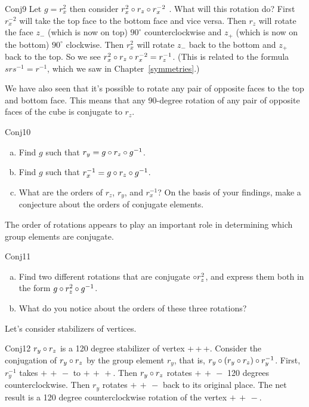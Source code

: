 \begin{example}{Conj9} 
Let  $g=r_x^2$ then consider $r_x^2\circ r_z\circ r_x^{-2}$ .   What will this rotation do? First $r_x^{-2}$ will take the top face to the bottom face and vice versa. Then $r_z$ will rotate the face $z_-$ (which is now on top)   $90^{\circ}$ counterclockwise and  $z_+$ (which is now on the bottom)  $90^{\circ}$ clockwise.  Then $r_x^2$ will rotate $z_-$ back to the bottom and $z_+$ back to the top.  So we see $r_x^2\circ r_z\circ r_x^{-2} = r_z^{-1}$. (This is related to the formula $s r s^{-1} = r^{-1}$, which we saw in Chapter~\ref{symmetries}.)  
\end{example}

We have also seen that it's possible to rotate any pair of opposite faces to the top and bottom face. This means that any 90-degree rotation of any pair of opposite faces of the cube is conjugate to $r_z$.  

\begin{exercise}{Conj10}
\begin{enumerate} [(a)]
\item 
Find $g$ such that $r_y = g \circ r_z \circ g^{-1}$.
\item 
Find $g$ such that $r_x^{-1} = g \circ r_z \circ g^{-1}$.
\item What  are the orders of $r_z$, $r_y$, and $r_x^{-1}$? On the basis of your findings, make a conjecture about the orders of conjugate elements.
\end{enumerate}
\end{exercise}

The order of rotations appears to play an important role in determining which group elements are conjugate.

\begin{exercise}{Conj11}
\begin{enumerate}[(a)]
\item Find two different rotations that are conjugate $\circ r_z^2$, and express them both in the form 
$ g \circ r_z^2 \circ g^{-1}$.
\item What do you notice about the orders of these three rotations?
\end {enumerate}
\end{exercise}

 Let's consider stabilizers of vertices.

\begin{example}{Conj12}
 $r_y\circ r_z$ is a 120 degree stabilizer of vertex {+\,+\,+}.  Consider the conjugation of $r_y\circ r_z$ by the group element $r_y$, that is,  $r_y\circ (r_y\circ r_z)\circ r_y^{-1}$. First, $r_y^{-1}$ takes ${+\,+\,-}$ to ${+\,+\,+}$.  Then $r_y\circ r_z$ rotates ${+\,+\,-}$ 120 degrees counterclockwise. Then $r_y$ rotates ${+\,+\,-}$ back to its original place.  The net result is a 120 degree counterclockwise rotation of the vertex ${+\,+\,-}$.
\end{example}

